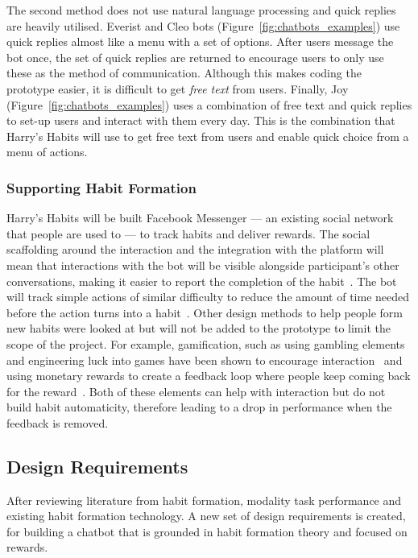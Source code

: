 The second method does not use natural language processing and quick replies are heavily utilised. Everist and Cleo bots (Figure~\ref{fig:chatbots_examples}) use quick replies almost like a menu with a set of options. After users message the bot once, the set of quick replies are returned to encourage users to only use these as the method of communication. Although this makes coding the prototype easier, it is difficult to get \textit{free text} from users. Finally, Joy (Figure~\ref{fig:chatbots_examples}) uses a combination of free text and quick replies to set-up users and interact with them every day. This is the combination that Harry's Habits will use to get free text from users and enable quick choice from a menu of actions.


\subsubsection*{Supporting Habit Formation}
Harry's Habits will be built Facebook Messenger --- an existing social network that people are used to --- to track habits and deliver rewards. The social scaffolding around the interaction and the integration with the platform will mean that interactions with the bot will be visible alongside participant's other conversations, making it easier to report the completion of the habit~\cite{the_power_of_logging_mobile_notifications}. The bot will track simple actions of similar difficulty to reduce the amount of time needed before the action turns into a habit~\cite{article_how_habits_formed_modelling_habit_formation}. Other design methods to help people form new habits were looked at but will not be added to the prototype to limit the scope of the project. For example, gamification, such as using gambling elements and engineering luck into games have been shown to encourage interaction~\cite{article_free_to_play_making_money_from_games_you_give_away} and using monetary rewards to create a feedback loop where people keep coming back for the reward~\cite{website_how_to_design_feedback_loops}. Both of these elements can help with interaction but do not build habit automaticity, therefore leading to a drop in performance when the feedback is removed.

\subsection{Design Requirements} \label{recommendations}
After reviewing literature from habit formation, modality task performance and existing habit formation technology. A new set of design requirements is created, for building a chatbot that is grounded in habit formation theory and focused on rewards.

